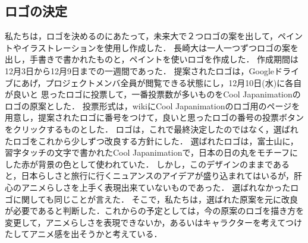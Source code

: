 \subsection{ロゴの決定}
\par
私たちは，ロゴを決めるのにあたって，未来大で２つロゴの案を出して，ペイントやイラストレーションを使用し作成した．
長崎大は一人一つずつロゴの案を出し，手書きで書かれたものと，ペイントを使いロゴを作成した．
作成期間は12月3日から12月9日までの一週間であった．
提案されたロゴは，Googleドライブにあげ，プロジェクトメンバ全員が閲覧できる状態にし，12月10日(水)に各自が良いと
思ったロゴに投票して，一番投票数が多いものをCool Japanimationのロゴの原案とした．
投票形式は，wikiにCool Japanimationのロゴ用のページを用意し，提案されたロゴに番号をつけて，良いと思ったロゴの番号の投票ボタンをクリックするものとした．
ロゴは，これで最終決定したのではなく，選ばれたロゴをこれから少しずつ改良する方針にした．
選ばれたロゴは，富士山に，習字タッチの文字で書かれたCool Japanimationで，日本の日の丸をモチーフにした赤が背景の色として使われていた．
しかし，このデザインのままであると，日本らしさと旅行に行くニュアンスのアイデアが盛り込まれてはいるが，肝心のアニメらしさを上手く表現出来ていないものであった．
選ばれなかったロゴに関しても同じことが言えた．
そこで，私たちは，選ばれた原案を元に改良が必要であると判断した．これからの予定としては，今の原案のロゴを描き方を変更して，アニメらしさを表現できないか，あるいはキャラクターを考えてつけたしてアニメ感を出そうかと考えている．
